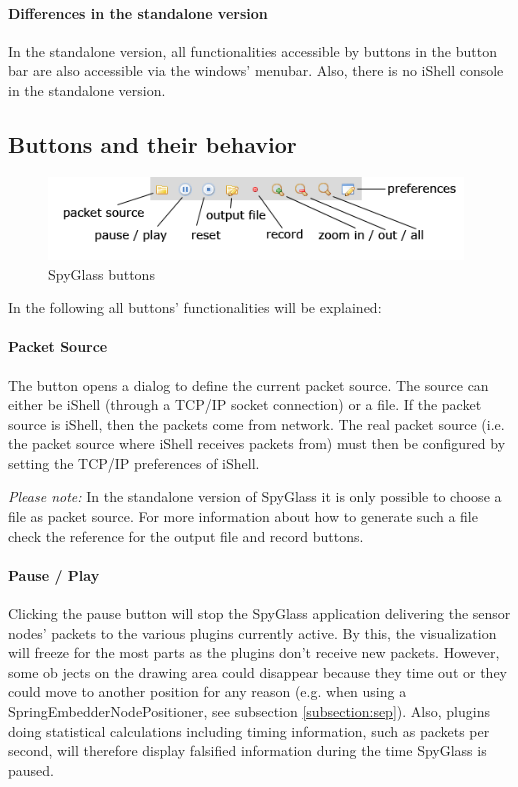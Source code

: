 		\paragraph{Differences in the standalone version}
			
			In the standalone version, all functionalities accessible by buttons in the button
			bar are also accessible via the windows’ menubar. Also, there is no iShell
			console in the standalone version.
			
	\subsection{Buttons and their behavior}
	\label{ssec:buttons_behaviour}

		\begin{figure}[htb]
			\begin{center}
				\includegraphics[width=11cm]{./pics/spyglass_buttons}
				\caption{SpyGlass buttons}
				\label{pic:spyglass_buttons}
			\end{center}
		\end{figure}

		In the following all buttons’ functionalities will be explained:
		
		\paragraph{Packet Source}
		  The button opens a dialog to define the current packet source. The source 
		  can either be iShell (through a TCP/IP socket connection) or a file. If 
		  the packet source is iShell, then the packets come from network. The real 
		  packet source (i.e. the packet source where iShell receives packets from)
		  must then be configured by setting the TCP/IP preferences of iShell.
		  
		  \emph{Please note:} In the standalone version of SpyGlass it is only possible to 
		  choose a file as packet source. For more information about how to generate 
		  such a file check the reference for the output file and record buttons.
			
		\paragraph{Pause / Play}
		  Clicking the pause button will stop the SpyGlass application delivering 
		  the sensor nodes’ packets to the various plugins currently active. By this, 
		  the visualization will freeze for the most parts as the plugins don’t receive 
		  new packets. However, some ob jects on the drawing area could disappear 
		  because they time out or they could move to another position for any 
		  reason (e.g. when using a SpringEmbedderNodePositioner, see subsection 
		  \ref{subsection:sep}). Also, plugins doing statistical calculations including
		  timing information, such as packets per second, will therefore display falsified
		  information during the time SpyGlass is paused.
		  
